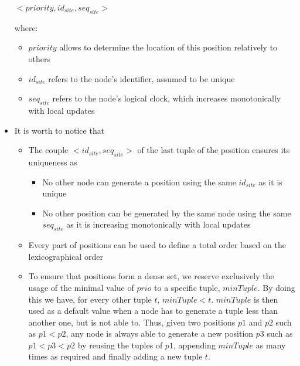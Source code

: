 \documentclass{article}
\begin{document}
\begin{itemize}
    \begin{center}
        $<priority, id_{site}, seq_{site}>$
    \end{center}

    where:

    \begin{itemize}
        \item $priority$ allows to determine the location of this position relatively to others
        \item $id_{site}$ refers to the node's identifier, assumed to be unique
        \item $seq_{site}$ refers to the node's logical clock, which increases monotonically with local updates
    \end{itemize}


    \item It is worth to notice that
    \begin{itemize}
        \item The couple $<id_{site}, seq_{site}>$ of the last tuple of the position ensures its uniqueness as
        \begin{itemize}
            \item No other node can generate a position using the same $id_{site}$ as it is unique
            \item No other position can be generated by the same node using the same $seq_{site}$ as it is increasing monotonically with local updates
        \end{itemize}
        \item Every part of positions can be used to define a total order based on the lexicographical order
        \item To ensure that positions form a dense set, we reserve exclusively the usage of the minimal value of $prio$ to a specific tuple, $minTuple$. By doing this we have, for every other tuple $t$, $minTuple < t$. $minTuple$ is then used as a default value when a node has to generate a tuple less than another one, but is not able to. Thus, given two positions $p1$ and $p2$ such as $p1 < p2$, any node is always able to generate a new position $p3$ such as $p1 < p3 < p2$ by reusing the tuples of $p1$, appending $minTuple$ as many times as required and finally adding a new tuple $t$.
    \end{itemize}
\end{itemize}
\end{document}
